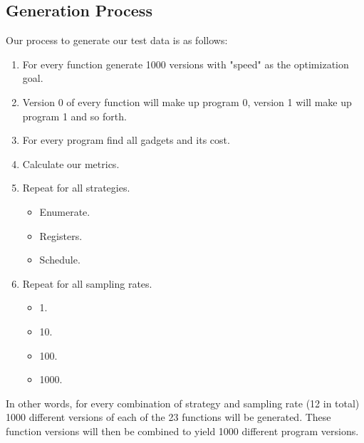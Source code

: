 \subsection{Generation Process}

Our process to generate our test data is as follows:

\begin{enumerate}
	\item For every function generate 1000 versions with "speed" as the optimization goal.
	\item Version 0 of every function will make up program 0, version 1 will make up program
		1 and so forth.
	\item For every program find all gadgets and its cost.
	\item Calculate our metrics.
	\item Repeat for all strategies.
		\begin{itemize}
			\item Enumerate.
			\item Registers.
			\item Schedule.
		\end{itemize}
	\item Repeat for all sampling rates.
		\begin{itemize}
			\item 1.
			\item 10.
			\item 100.
			\item 1000.
		\end{itemize}
\end{enumerate}

In other words, for every combination of strategy and sampling rate (12 in total) 1000
different versions of each of the 23 functions will be generated. These function versions
will then be combined to yield 1000 different program versions.
